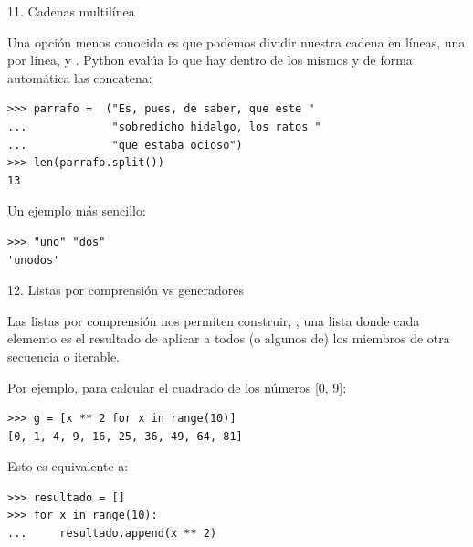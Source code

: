 \documentclass[14pt]{beamer}
\begin{document}
\begin{frame}[fragile]{11. Cadenas multilínea}

  \begin{alertblock}{}
    \small
    \centering
    Una opción menos conocida es que podemos dividir nuestra cadena en
    líneas, una por línea, y .
    Python evalúa lo que hay dentro de los mismos y de forma
    automática las concatena:
   \end{alertblock}

  \begin{exampleblock}{}
    \scriptsize
    \begin{lstlisting}
>>> parrafo =  ("Es, pues, de saber, que este "
...             "sobredicho hidalgo, los ratos "
...             "que estaba ocioso")
>>> len(parrafo.split())
13
    \end{lstlisting}
  \end{exampleblock}

  \small
  \begin{exampleblock}
    {Un ejemplo más sencillo:}
    \begin{lstlisting}
>>> "uno" "dos"
'unodos'
    \end{lstlisting}
  \end{exampleblock}
\end{frame}

\begin{frame}[fragile]{12. Listas por comprensión vs generadores}
  \begin{block}{}
    \small
    \centering
    Las listas por comprensión nos permiten construir, , una lista donde cada elemento es el resultado de
    aplicar  a todos (o algunos de) los
    miembros de otra secuencia o iterable.
  \end{block}

  \footnotesize
  \begin{exampleblock}
    {Por ejemplo, para calcular el cuadrado de los números [0, 9]:}
    \begin{lstlisting}
>>> g = [x ** 2 for x in range(10)]
[0, 1, 4, 9, 16, 25, 36, 49, 64, 81]
    \end{lstlisting}
  \end{exampleblock}

  \begin{exampleblock}
    {Esto es equivalente a:}
    \begin{lstlisting}
>>> resultado = []
>>> for x in range(10):
...     resultado.append(x ** 2)
    \end{lstlisting}
  \end{exampleblock}
\end{frame}
\end{document}
